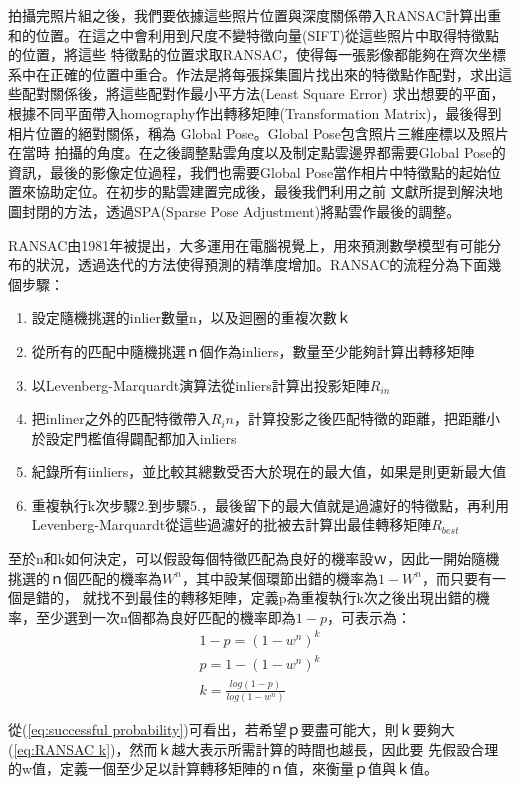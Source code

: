     拍攝完照片組之後，我們要依據這些照片位置與深度關係帶入RANSAC計算出重和的位置。在這之中會利用到尺度不變特徵向量(SIFT)從這些照片中取得特徵點的位置，將這些
特徵點的位置求取RANSAC，使得每一張影像都能夠在齊次坐標系中在正確的位置中重合。作法是將每張採集圖片找出來的特徵點作配對，求出這些配對關係後，將這些配對作最小平方法(Least Square Error)
求出想要的平面，根據不同平面帶入homography作出轉移矩陣(Transformation Matrix)，最後得到相片位置的絕對關係，稱為 Global Pose。Global Pose包含照片三維座標以及照片在當時
拍攝的角度。在之後調整點雲角度以及制定點雲邊界都需要Global Pose的資訊，最後的影像定位過程，我們也需要Global Pose當作相片中特徵點的起始位置來協助定位。在初步的點雲建置完成後，最後我們利用之前
文獻所提到解決地圖封閉的方法，透過SPA(Sparse Pose Adjustment)將點雲作最後的調整。

	RANSAC\cite{Fischler1981}由1981年被提出，大多運用在電腦視覺上，用來預測數學模型有可能分布的狀況，透過迭代的方法使得預測的精準度增加。RANSAC的流程分為下面幾個步驟：
　\begin{enumerate}
	  \item 設定隨機挑選的inlier數量n，以及迴圈的重複次數ｋ
	  \item 從所有的匹配中隨機挑選ｎ個作為inliers，數量至少能夠計算出轉移矩陣
	  \item 以Levenberg-Marquardt演算法從inliers計算出投影矩陣$R_{in}$
	  \item 把inliner之外的匹配特徵帶入$R_in$，計算投影之後匹配特徵的距離，把距離小於設定門檻值得闢配都加入inliers
	  \item 紀錄所有iinliers，並比較其總數受否大於現在的最大值，如果是則更新最大值
	  \item 重複執行k次步驟2.到步驟5.，最後留下的最大值就是過濾好的特徵點，再利用Levenberg-Marquardt從這些過濾好的批被去計算出最佳轉移矩陣$R_{best}$
 \end{enumerate}

	至於n和k如何決定，可以假設每個特徵匹配為良好的機率設ｗ，因此一開始隨機挑選的ｎ個匹配的機率為$W^n$，其中設某個環節出錯的機率為$1-W^n$，而只要有一個是錯的，
就找不到最佳的轉移矩陣，定義p為重複執行k次之後出現出錯的機率，至少選到一次n個都為良好匹配的機率即為$1-p$，可表示為：
\begin{align} 
	1-p = (1-w^n)^k  \label{eq:failure probability} \\
	p = 1 - (1-w^n)^k \label{eq:successful probability} \\
	k = \frac{log(1-p)}{log(1-w^n)} \label{eq:RANSAC k}
\end{align}

    從(\ref{eq:successful probability})可看出，若希望ｐ要盡可能大，則ｋ要夠大(\ref{eq:RANSAC k})，然而ｋ越大表示所需計算的時間也越長，因此要
先假設合理的w值，定義一個至少足以計算轉移矩陣的ｎ值，來衡量ｐ值與ｋ值。

